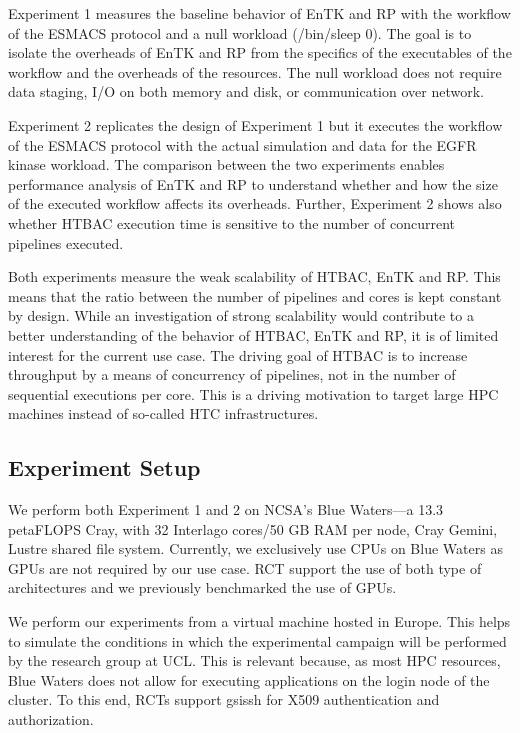 \documentclass[conference]{IEEEtran}
\begin{document}
Experiment 1 measures the baseline behavior of EnTK and RP with the workflow
of the ESMACS protocol and a null workload (\textmd{/bin/sleep 0}). The goal
is to isolate the overheads of EnTK and RP from the specifics of the
executables of the workflow and the overheads of the resources. The null
workload does not require data staging, I/O on both memory and disk, or
communication over network.

Experiment 2 replicates the design of Experiment 1 but it executes the
workflow of the ESMACS protocol with the actual simulation and data for the
EGFR kinase workload. The comparison between the two experiments enables
performance analysis of EnTK and RP to understand whether and how the size of
the executed workflow affects its overheads. Further, Experiment 2 shows also
whether HTBAC execution time is sensitive to the number of concurrent
pipelines executed.

Both experiments measure the weak scalability of HTBAC, EnTK and RP\@. This
means that the ratio between the number of pipelines and cores is kept
constant by design. While an investigation of strong scalability would
contribute to a better understanding of the behavior of HTBAC, EnTK and RP,
it is of limited interest for the current use case. The driving goal of HTBAC
is to increase throughput by a means of concurrency of pipelines, not in the
number of sequential executions per core. This is a driving motivation to
target large HPC machines instead of so-called HTC infrastructures.

%
\subsection{Experiment Setup}\label{ssec:exp_setup}

We perform both Experiment 1 and 2 on NCSA's Blue Waters---a 13.3 petaFLOPS
Cray, with 32 Interlago cores/50 GB RAM per node, Cray Gemini, Lustre shared
file system. Currently, we exclusively use CPUs on Blue Waters as GPUs are
not required by our use case. RCT support the use of both type of
architectures and we previously benchmarked the use of GPUs.

We perform our experiments from a virtual machine hosted in Europe. This
helps to simulate the conditions in which the experimental campaign will be
performed by the research group at UCL\@. This is relevant because, as most
HPC resources, Blue Waters does not allow for executing applications on the
login node of the cluster. To this end, RCTs support \textmd{gsissh} for X509
authentication and authorization.
\end{document}
